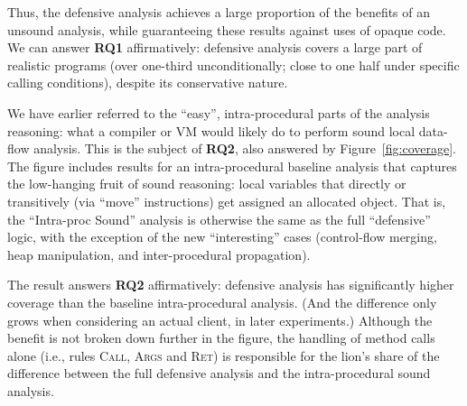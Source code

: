 Thus, the defensive analysis achieves a large proportion of the
benefits of an unsound analysis, while guaranteeing these results
against uses of opaque code.  We can answer \textbf{RQ1}
affirmatively: defensive analysis covers a large part of realistic
programs (over one-third unconditionally; close to one half under
specific calling conditions), despite its conservative nature.

We have earlier referred to the ``easy'', intra-procedural parts of the
analysis reasoning: what a compiler or VM would likely do to perform
sound local data-flow analysis. This is the subject of \textbf{RQ2},
also answered by Figure~\ref{fig:coverage}. The figure includes
results for an intra-procedural baseline analysis that captures the
low-hanging fruit of sound reasoning: local variables that directly or
transitively (via ``move'' instructions) get assigned an allocated
object. That is, the ``Intra-proc Sound'' analysis is otherwise the
same as the full ``defensive'' logic, with the exception of the
new ``interesting'' cases (control-flow merging, heap manipulation,
and inter-procedural propagation). 

The result answers \textbf{RQ2} affirmatively: defensive analysis has
significantly higher coverage than the baseline intra-procedural
analysis. (And the difference only grows when considering an actual
client, in later experiments.) Although the benefit is not broken down
further in the figure, the handling of method calls alone (i.e., rules
\textsc{Call}, \textsc{Args} and \textsc{Ret}) is responsible for the
lion's share of the difference between the full defensive analysis and
the intra-procedural sound analysis.



